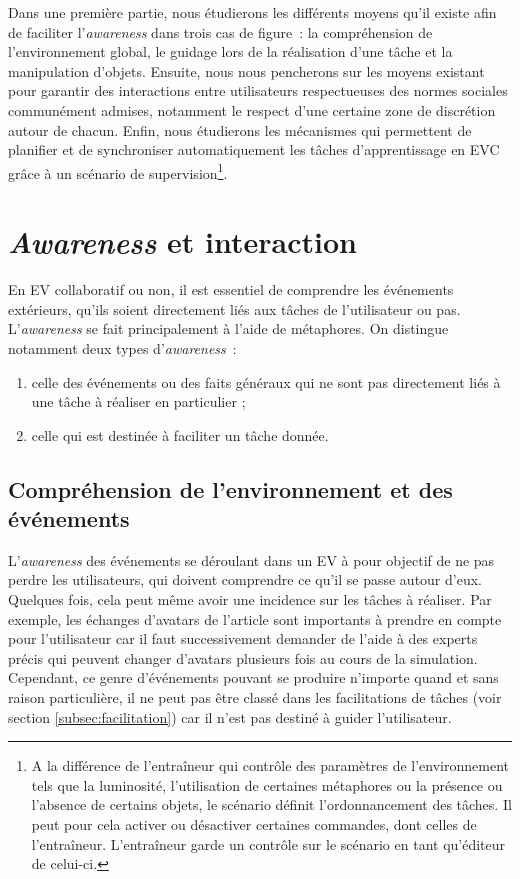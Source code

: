 \documentclass[11pt]{article}
\begin{document}
Dans une première partie, nous étudierons les différents moyens qu'il existe afin de faciliter l'\textit{awareness} dans trois cas de figure~: la compréhension de l'environnement global, le guidage lors de la réalisation d'une tâche et la manipulation d'objets. Ensuite, nous nous pencherons sur les moyens existant pour garantir des interactions entre utilisateurs respectueuses des normes sociales communément admises, notamment le respect d'une certaine zone de discrétion autour de chacun. Enfin, nous étudierons les mécanismes qui permettent de planifier et de synchroniser automatiquement les tâches d'apprentissage en EVC grâce à un scénario de supervision\footnote{A la différence de l'entraîneur qui contrôle des paramètres de l'environnement tels que la luminosité, l'utilisation de certaines métaphores ou la présence ou l'absence de certains objets, le scénario définit l'ordonnancement des tâches. Il peut pour cela activer ou désactiver certaines commandes, dont celles de l'entraîneur. L'entraîneur garde un contrôle sur le scénario en tant qu'éditeur de celui-ci.}.

\section{\textit{Awareness} et interaction}

En EV collaboratif ou non, il est essentiel de comprendre les événements extérieurs, qu'ils soient directement liés aux tâches de l'utilisateur ou pas. L'\textit{awareness} se fait principalement à l'aide de métaphores. On distingue notamment deux types d'\textit{awareness}~:
\begin{enumerate}
	\item celle des événements ou des faits généraux qui ne sont pas directement liés à une tâche à réaliser en particulier ;
	\item celle qui est destinée à faciliter un tâche donnée.
\end{enumerate}

\subsection{Compréhension de l'environnement et des événements}
L'\textit{awareness} des événements se déroulant dans un EV à pour objectif de ne pas perdre les utilisateurs, qui doivent comprendre ce qu'il se passe autour d'eux. Quelques fois, cela peut même avoir une incidence sur les tâches à réaliser. Par exemple, les échanges d'avatars de l'article \cite{avatars} sont importants à prendre en compte pour l'utilisateur car il faut successivement demander de l'aide à des experts précis qui peuvent changer d'avatars plusieurs fois au cours de la simulation. Cependant, ce genre d'événements pouvant se produire n'importe quand et sans raison particulière, il ne peut pas être classé dans les facilitations de tâches (voir section \ref{subsec:facilitation}) car il n'est pas destiné à guider l'utilisateur.
\\
\end{document}
